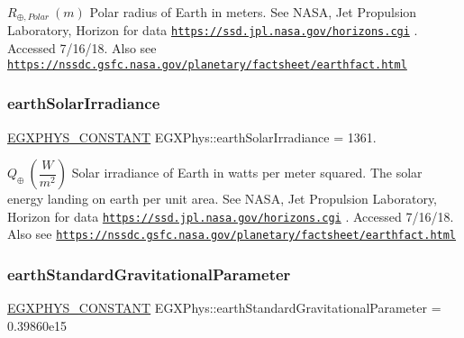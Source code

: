 $R_{\oplus,Polar} \ (m)$ Polar radius of Earth in meters. See N\+A\+SA, Jet Propulsion Laboratory, Horizon for data \href{https://ssd.jpl.nasa.gov/horizons.cgi}{\tt https\+://ssd.\+jpl.\+nasa.\+gov/horizons.\+cgi} . Accessed 7/16/18. Also see \href{https://nssdc.gsfc.nasa.gov/planetary/factsheet/earthfact.html}{\tt https\+://nssdc.\+gsfc.\+nasa.\+gov/planetary/factsheet/earthfact.\+html} \mbox{\label{group___e_g_x_phys-_constants-_astrophysics-_solar_system-_earth-_bulk_ga24723f27199b46aa1ad76d93bbe93b11}} 
\subsubsection{\texorpdfstring{earth\+Solar\+Irradiance}{earthSolarIrradiance}}
{\footnotesize\ttfamily \mbox{\hyperlink{group___e_g_x_phys-_constants-_macros_ga76980d288494ce1714c9ac68a95ba702}{E\+G\+X\+P\+H\+Y\+S\+\_\+\+C\+O\+N\+S\+T\+A\+NT}} E\+G\+X\+Phys\+::earth\+Solar\+Irradiance = 1361.}

$ Q_{\oplus} \ (\dfrac{W}{m^2})$ Solar irradiance of Earth in watts per meter squared. The solar energy landing on earth per unit area. See N\+A\+SA, Jet Propulsion Laboratory, Horizon for data \href{https://ssd.jpl.nasa.gov/horizons.cgi}{\tt https\+://ssd.\+jpl.\+nasa.\+gov/horizons.\+cgi} . Accessed 7/16/18. Also see \href{https://nssdc.gsfc.nasa.gov/planetary/factsheet/earthfact.html}{\tt https\+://nssdc.\+gsfc.\+nasa.\+gov/planetary/factsheet/earthfact.\+html} \mbox{\label{group___e_g_x_phys-_constants-_astrophysics-_solar_system-_earth-_bulk_gaaabe1a1d2cea41e00fb1646a25d9eafe}} 
\subsubsection{\texorpdfstring{earth\+Standard\+Gravitational\+Parameter}{earthStandardGravitationalParameter}}
{\footnotesize\ttfamily \mbox{\hyperlink{group___e_g_x_phys-_constants-_macros_ga76980d288494ce1714c9ac68a95ba702}{E\+G\+X\+P\+H\+Y\+S\+\_\+\+C\+O\+N\+S\+T\+A\+NT}} E\+G\+X\+Phys\+::earth\+Standard\+Gravitational\+Parameter = 0.\+39860e15}

